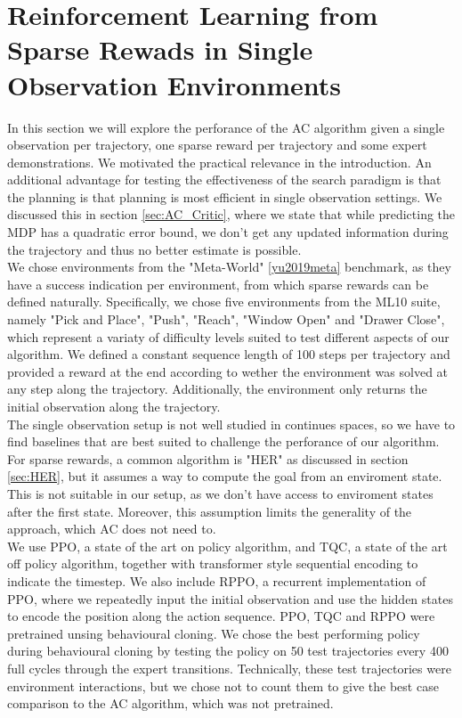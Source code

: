 \section{Reinforcement Learning from Sparse Rewads in Single Observation Environments}
In this section we will explore the perforance of the AC algorithm given a single observation per trajectory, one sparse reward per trajectory and some expert demonstrations.  
We motivated the practical relevance in the introduction. An additional advantage for testing the effectiveness of the search paradigm is that the planning is that planning is most efficient in 
single observation settings. 
We discussed this in section \ref{sec:AC_Critic}, where we state that while predicting the MDP has a quadratic error bound, we don't get any updated information 
during the trajectory and thus no better estimate is possible. \\

We chose environments from the "Meta-World" \ref{yu2019meta} benchmark, as they have a success indication per environment, from which sparse rewards can be defined naturally. 
Specifically, we chose five environments from the ML10 suite, namely "Pick and Place", "Push", "Reach", "Window Open" and "Drawer Close", which represent a variaty 
of difficulty levels suited to test different aspects of our algorithm. We defined a constant sequence length of 100 steps per trajectory and provided 
a reward at the end according to wether the environment was solved at any step along the trajectory. Additionally, the environment 
only returns the initial observation along the trajectory.\\

The single observation setup is not well studied in continues spaces, so we have to find baselines that are best suited to challenge the perforance of our algorithm. For sparse rewards, a common 
algorithm is "HER" as discussed in section \ref{sec:HER}, but it assumes a way to compute the goal from an enviroment state. This is not suitable in our setup, as we don't have access to enviroment 
states after the first state. Moreover, this assumption limits the generality of the approach, which AC does not need to. \\
We use PPO, a state of the art on 
policy algorithm, and TQC, a state of the art off policy algorithm, together with transformer style sequential encoding to indicate the timestep. We also include 
RPPO, a recurrent implementation of PPO, where we repeatedly input the initial observation and use the hidden states to encode the position along the action sequence. 
PPO, TQC and RPPO were pretrained unsing behavioural cloning. We chose the best performing policy during behavioural cloning by testing the policy on 50 test 
trajectories every 400 full cycles through the 
expert transitions. Technically, these test trajectories were environment interactions, but we chose not to count them to give the best case comparison to the AC algorithm, which was not pretrained.\\

